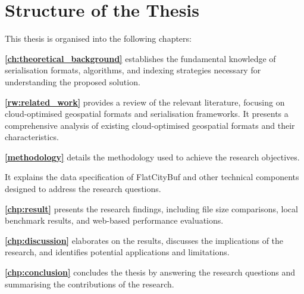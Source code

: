 \section{Structure of the Thesis}
\label{introduction:structure_of_the_thesis}

This thesis is organised into the following chapters:

\textbf{\autoref{ch:theoretical_background}} establishes the fundamental knowledge of serialisation formats, algorithms, and indexing strategies necessary for understanding the proposed solution.

\textbf{\autoref{rw:related_work}} provides a review of the relevant literature, focusing on cloud-optimised geospatial formats and serialisation frameworks.
It presents a comprehensive analysis of existing cloud-optimised geospatial formats and their characteristics.

\textbf{\autoref{methodology}} details the methodology used to achieve the research objectives.

It explains the data specification of FlatCityBuf and other technical components designed to address the research questions.

\textbf{\autoref{chp:result}} presents the research findings, including file size comparisons, local benchmark results, and web-based performance evaluations.

\textbf{\autoref{chp:discussion}} elaborates on the results, discusses the implications of the research, and identifies potential applications and limitations.

\textbf{\autoref{chp:conclusion}} concludes the thesis by answering the research questions and summarising the contributions of the research.